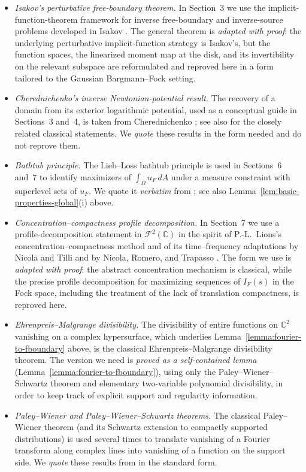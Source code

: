 \documentclass[a4paper,11pt,reqno]{amsart}
\numberwithin{equation}{section}
\theoremstyle{plain} %
\theoremstyle{definition} %
\theoremstyle{remark}
\newcommand{\C}{\mathbb{C}}
\begin{document}
\begin{itemize}
\item \emph{Isakov's perturbative free-boundary theorem.} In Section~3 we
use the implicit-function-theorem framework for inverse free-boundary and
inverse-source problems developed in Isakov \cite{Isakov}. The general
theorem is \emph{adapted with proof}: the underlying perturbative
implicit-function strategy is Isakov's, but the function spaces, the
linearized moment map at the disk, and its invertibility on the relevant
subspace are reformulated and reproved here in a form tailored to the
Gaussian Bargmann--Fock setting.

\item \emph{Cherednichenko's inverse Newtonian-potential result.} The
recovery of a domain from its exterior logarithmic potential, used as a
conceptual guide in Sections~3 and~4, is taken from Cherednichenko
\cite{Cherednichenko}; see also \cite{Karp,Aharonov-Schiffer-Zalcman} for
the closely related classical statements. We \emph{quote} these
results in the form needed and do not reprove them.

\item \emph{Bathtub principle.} The Lieb--Loss bathtub principle is used
in Sections~6 and~7 to identify maximizers of $\int_\Omega u_F\,dA$ under
a measure constraint with superlevel sets of $u_F$. We quote it
\emph{verbatim} from \cite{Lieb}; see also Lemma~\ref{lem:basic-properties-global}(i)
above.

\item \emph{Concentration--compactness profile decomposition.} In
Section~7 we use a profile-decomposition statement in $\mathcal F^2(\C)$
in the spirit of P.-L.~Lions's concentration--compactness method and of
its time--frequency adaptations by Nicola and Tilli \cite{Nicola-Tilli,Nicola-Tilli-2}
and by Nicola, Romero, and Trapasso \cite{Nicola-Romero-Trapasso}. The
form we use is \emph{adapted with proof}: the abstract concentration
mechanism is classical, while the precise profile decomposition for
maximizing sequences of $I_F(s)$ in the Fock space, including the
treatment of the lack of translation compactness, is reproved here.

\item \emph{Ehrenpreis--Malgrange divisibility.} The divisibility of
entire functions on $\C^2$ vanishing on a complex hypersurface, which
underlies Lemma~\ref{lemma:fourier-to-fboundary} above, is the classical
Ehrenpreis--Malgrange divisibility theorem. The version we need is
\emph{proved as a self-contained lemma} (Lemma~\ref{lemma:fourier-to-fboundary}),
using only the Paley--Wiener--Schwartz theorem and elementary
two-variable polynomial divisibility, in order to keep track of explicit
support and regularity information.

\item \emph{Paley--Wiener and Paley--Wiener--Schwartz theorems.} The
classical Paley--Wiener theorem (and its Schwartz extension to compactly
supported distributions) is used several times to translate vanishing of
a Fourier transform along complex lines into vanishing of a function on
the support side. We \emph{quote} these results from
\cite{Hormander,Folland} in the standard form.
\end{itemize}
\end{document}
